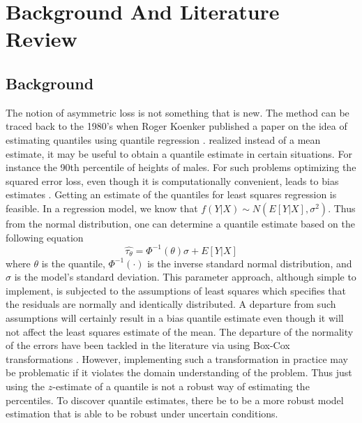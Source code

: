 \chapter{Background And Literature Review}\label{chapter:Background}
\section{Background}
The notion of asymmetric loss is not something that is new. The method can be traced back to the 1980's when Roger Koenker published a paper on the idea of estimating quantiles using quantile regression \citet{Koenker78}. \citep{Koenker78} realized instead of a mean estimate, it may be useful to obtain a quantile estimate in certain situations. For instance the 90th percentile of heights of males. For such problems optimizing the squared error loss, even though it is computationally convenient, leads to bias estimates \citep{Koenker01}. Getting an estimate of the quantiles for least squares regression is feasible. In a regression model, we know that $f(Y|X)\sim N(E[Y|X],\sigma^2)$. Thus from the normal distribution, one can determine a quantile estimate based on the following equation
\begin{equation}
	\hat{\tau_\theta} = \Phi^{-1}(\theta) \sigma + E[Y|X]
\end{equation}
where $\theta$ is the quantile,  $\Phi^{-1}(\cdot)$ is the inverse standard normal distribution, and $\sigma$ is the model's standard deviation. This parameter approach, although simple to implement, is subjected to the assumptions of least squares which specifies that the residuals are normally and identically distributed. A departure from such assumptions will certainly result in a bias quantile estimate  even though it will not affect the least squares estimate of the mean. The departure of the normality of the errors have been tackled in the literature via using Box-Cox transformations \citep{Wei06}. However, implementing such a transformation in practice may be problematic if it violates the domain understanding of the problem. Thus just using the $z$-estimate of a quantile is not a robust way of estimating the percentiles. To discover quantile estimates, there be to be a more robust model estimation that is able to be robust under uncertain conditions.

